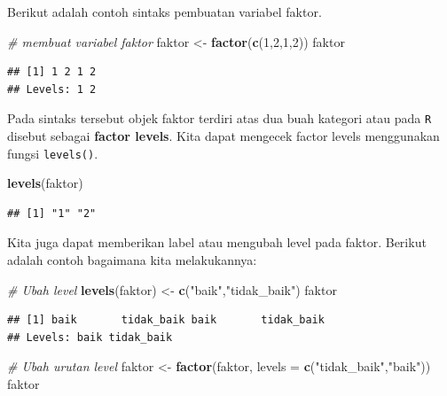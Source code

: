 \documentclass[]{book}
\newenvironment{Shaded}{\begin{snugshade}}{\end{snugshade}}
\newcommand{\KeywordTok}[1]{\textcolor[rgb]{0.13,0.29,0.53}{\textbf{#1}}}
\newcommand{\DataTypeTok}[1]{\textcolor[rgb]{0.13,0.29,0.53}{#1}}
\newcommand{\DecValTok}[1]{\textcolor[rgb]{0.00,0.00,0.81}{#1}}
\newcommand{\StringTok}[1]{\textcolor[rgb]{0.31,0.60,0.02}{#1}}
\newcommand{\CommentTok}[1]{\textcolor[rgb]{0.56,0.35,0.01}{\textit{#1}}}
\newcommand{\NormalTok}[1]{#1}
\begin{document}
Berikut adalah contoh sintaks pembuatan variabel faktor.

\begin{Shaded}
\begin{Highlighting}[]
\CommentTok{# membuat variabel faktor}
\NormalTok{faktor <-}\StringTok{ }\KeywordTok{factor}\NormalTok{(}\KeywordTok{c}\NormalTok{(}\DecValTok{1}\NormalTok{,}\DecValTok{2}\NormalTok{,}\DecValTok{1}\NormalTok{,}\DecValTok{2}\NormalTok{))}
\NormalTok{faktor}
\end{Highlighting}
\end{Shaded}

\begin{verbatim}
## [1] 1 2 1 2
## Levels: 1 2
\end{verbatim}

Pada sintaks tersebut objek faktor terdiri atas dua buah kategori atau
pada \texttt{R} disebut sebagai \textbf{factor levels}. Kita dapat
mengecek factor levels menggunakan fungsi \texttt{levels()}.

\begin{Shaded}
\begin{Highlighting}[]
\KeywordTok{levels}\NormalTok{(faktor)}
\end{Highlighting}
\end{Shaded}

\begin{verbatim}
## [1] "1" "2"
\end{verbatim}

Kita juga dapat memberikan label atau mengubah level pada faktor.
Berikut adalah contoh bagaimana kita melakukannya:

\begin{Shaded}
\begin{Highlighting}[]
\CommentTok{# Ubah level}
\KeywordTok{levels}\NormalTok{(faktor) <-}\StringTok{ }\KeywordTok{c}\NormalTok{(}\StringTok{"baik"}\NormalTok{,}\StringTok{"tidak_baik"}\NormalTok{)}
\NormalTok{faktor}
\end{Highlighting}
\end{Shaded}

\begin{verbatim}
## [1] baik       tidak_baik baik       tidak_baik
## Levels: baik tidak_baik
\end{verbatim}

\begin{Shaded}
\begin{Highlighting}[]
\CommentTok{# Ubah urutan level}
\NormalTok{faktor <-}\StringTok{ }\KeywordTok{factor}\NormalTok{(faktor,}
                 \DataTypeTok{levels =} \KeywordTok{c}\NormalTok{(}\StringTok{"tidak_baik"}\NormalTok{,}\StringTok{"baik"}\NormalTok{))}
\NormalTok{faktor}
\end{Highlighting}
\end{Shaded}
\end{document}
